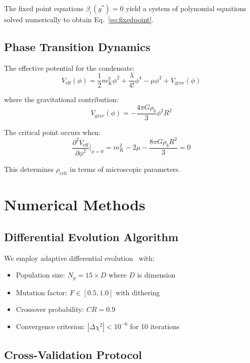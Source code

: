 \documentclass[aps,prd,twocolumn,showpacs,superscriptaddress,groupedaddress,nofootinbib]{revtex4-2}
\begin{document}
The fixed point equations $\beta_i(g^*) = 0$ yield a system of polynomial equations solved numerically to obtain Eq.~\ref{eq:fixedpoint}.

\subsection{Phase Transition Dynamics}

The effective potential for the condensate:
\begin{equation}
V_{\text{eff}}(\phi) = \frac{1}{2}m_K^2\phi^2 + \frac{\lambda}{4!}\phi^4 - \mu\phi^2 + V_{\text{grav}}(\phi)
\end{equation}

where the gravitational contribution:
\begin{equation}
V_{\text{grav}}(\phi) = -\frac{4\pi G \rho_b}{3}\phi^2 R^2
\end{equation}

The critical point occurs when:
\begin{equation}
\frac{\partial^2 V_{\text{eff}}}{\partial \phi^2}\Bigg|_{\phi=0} = m_K^2 - 2\mu - \frac{8\pi G \rho_b R^2}{3} = 0
\end{equation}

This determines $\rho_{\text{crit}}$ in terms of microscopic parameters.

\section{Numerical Methods}
\label{app:numerical}

\subsection{Differential Evolution Algorithm}

We employ adaptive differential evolution~\cite{Zhang2009} with:
\begin{itemize}
\item Population size: $N_p = 15 \times D$ where $D$ is dimension
\item Mutation factor: $F \in [0.5, 1.0]$ with dithering
\item Crossover probability: $CR = 0.9$
\item Convergence criterion: $|\Delta\chi^2| < 10^{-6}$ for 10 iterations
\end{itemize}

\subsection{Cross-Validation Protocol}
\end{document}

